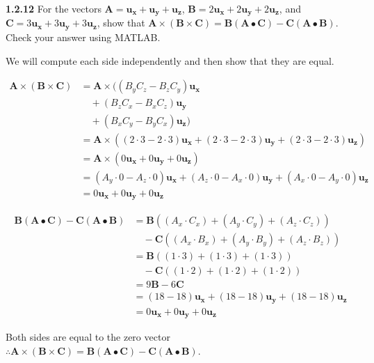 \documentclass{article}
\begin{document}
\textbf{1.2.12} For the vectors $\mathbf{A} = \mathbf{u_x} + \mathbf{u_y} + \mathbf{u_z}$, $\mathbf{B} = 2\mathbf{u_x} +
	2\mathbf{u_y} + 2\mathbf{u_z}$, and $\mathbf{C} = 3\mathbf{u_x} + 3\mathbf{u_y} + 3\mathbf{u_z}$, show that $\mathbf{A}
	\times (\mathbf{B} \times \mathbf{C}) = \mathbf{B} (\mathbf{A} \bullet \mathbf{C}) - \mathbf{C} (\mathbf{A} \bullet
	\mathbf{B})$. Check your answer using MATLAB.\@

\vspace{24pt}

We will compute each side independently and then show that they are equal.

\begin{equation*}
	\begin{split}
		\mathbf{A} \times (\mathbf{B} \times \mathbf{C}) & = \mathbf{A} \times ((B_y C_z - B_z C_y)\mathbf{u_x} \\
		& \quad + (B_z C_x - B_x C_z)\mathbf{u_y} \\
		& \quad + (B_x C_y - B_y C_x)\mathbf{u_z}) \\
		& = \mathbf{A} \times \left( (2 \cdot 3 - 2 \cdot 3)\mathbf{u_x} + (2 \cdot 3 - 2 \cdot 3)\mathbf{u_y} + (2 \cdot 3 - 2 \cdot 3)\mathbf{u_z} \right) \\
		& = \mathbf{A} \times (0\mathbf{u_x} + 0\mathbf{u_y} + 0\mathbf{u_z}) \\
		& = (A_y \cdot 0 - A_z \cdot 0)\mathbf{u_x} + (A_z \cdot 0 - A_x \cdot 0)\mathbf{u_y} + (A_x \cdot 0 - A_y \cdot 0)\mathbf{u_z} \\
		& = 0\mathbf{u_x} + 0\mathbf{u_y} + 0\mathbf{u_z}
	\end{split}
\end{equation*}

\begin{equation*}
	\begin{split}
		\mathbf{B} (\mathbf{A} \bullet \mathbf{C}) - \mathbf{C} (\mathbf{A} \bullet \mathbf{B}) & = \mathbf{B} ((A_x \cdot C_x) + (A_y \cdot C_y) + (A_z \cdot C_z)) \\
		& \quad - \mathbf{C} ((A_x \cdot B_x) + (A_y \cdot B_y) + (A_z \cdot B_z)) \\
		& = \mathbf{B} ((1 \cdot 3) + (1 \cdot 3) + (1 \cdot 3)) \\
		& \quad - \mathbf{C} ((1 \cdot 2) + (1 \cdot 2) + (1 \cdot 2)) \\
		& = 9 \mathbf{B} - 6 \mathbf{C} \\
		& = (18 - 18)\mathbf{u_x} + (18 - 18)\mathbf{u_y} + (18 - 18)\mathbf{u_z} \\
		& = 0\mathbf{u_x} + 0\mathbf{u_y} + 0\mathbf{u_z}
	\end{split}
\end{equation*}

Both sides are equal to the zero vector $\therefore \mathbf{A} \times (\mathbf{B} \times \mathbf{C}) = \mathbf{B}
	(\mathbf{A} \bullet \mathbf{C}) - \mathbf{C} (\mathbf{A} \bullet \mathbf{B})$.
\end{document}
